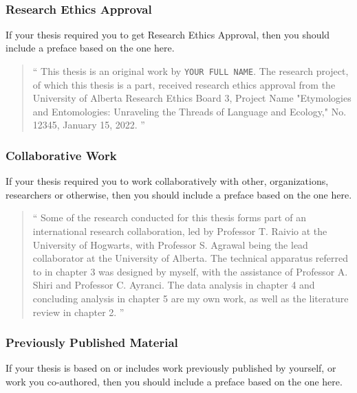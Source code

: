 			\\

			\subsubsection{Research Ethics Approval}
				If your thesis required you to get Research Ethics Approval, then you should include a preface based on the one here.

				\begin{quote}
					\enquote{
						This thesis is an original work by \texttt{YOUR FULL NAME}. 
						The research project, of which this thesis is a part, received research ethics approval from the University of Alberta Research Ethics Board 3, Project Name "Etymologies and Entomologies: Unraveling the Threads of Language and Ecology," No. 12345, January 15, 2022.  
					}
				\end{quote}

			\subsubsection{Collaborative Work}
				If your thesis required you to work collaboratively with other, organizations, researchers or otherwise, then you should include a preface based on the one here.

				\begin{quote}
					\enquote{
						Some of the research conducted for this thesis forms part of an international research collaboration, led by Professor T. Raivio at the University of Hogwarts, with Professor S. Agrawal being the lead collaborator at the University of Alberta. 
						The technical apparatus referred to in chapter 3 was designed by myself, with the assistance of Professor A. Shiri and Professor C. Ayranci. 
						The data analysis in chapter 4 and concluding analysis in chapter 5 are my own work, as well as the literature review in chapter 2.  
					}
				\end{quote}

			\subsubsection{Previously Published Material}
				If your thesis is based on or includes work previously published by yourself, or work you co-authored, then you should include a preface based on the one here.

